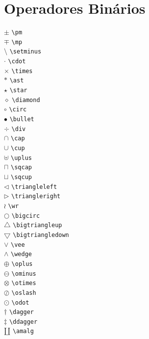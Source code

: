 \documentclass[xindy,draft]{fei}
\begin{document}
\section{Operadores Binários}
\begin{multicols}{3}
\noindent
\(\pm\) \verb+\pm+\\
\(\mp\) \verb+\mp+\\
\(\setminus\) \verb+\setminus+\\
\(\cdot\) \verb+\cdot+\\
\(\times\) \verb+\times+\\
\(\ast\) \verb+\ast+\\
\(\star\) \verb+\star+\\
\(\diamond\) \verb+\diamond+\\
\(\circ\) \verb+\circ+\\
\(\bullet\) \verb+\bullet+\\
\(\div\) \verb+\div+\\
\(\cap\) \verb+\cap+\\
\(\cup\) \verb+\cup+\\
\(\uplus\) \verb+\uplus+\\
\(\sqcap\) \verb+\sqcap+\\
\(\sqcup\) \verb+\sqcup+\\
\(\triangleleft\) \verb+\triangleleft+\\
\(\triangleright\) \verb+\triangleright+\\
\(\wr\) \verb+\wr+\\
\(\bigcirc\) \verb+\bigcirc+\\
\(\bigtriangleup\) \verb+\bigtriangleup+\\
\(\bigtriangledown\) \verb+\bigtriangledown+\\
\(\vee\) \verb+\vee+\\
\(\wedge\) \verb+\wedge+\\
\(\oplus\) \verb+\oplus+\\
\(\ominus\) \verb+\ominus+\\
\(\otimes\) \verb+\otimes+\\
\(\oslash\) \verb+\oslash+\\
\(\odot\) \verb+\odot+\\
\(\dagger\) \verb+\dagger+\\
\(\ddagger\) \verb+\ddagger+\\
\(\amalg\) \verb+\amalg+\\
\end{multicols}
\end{document}
